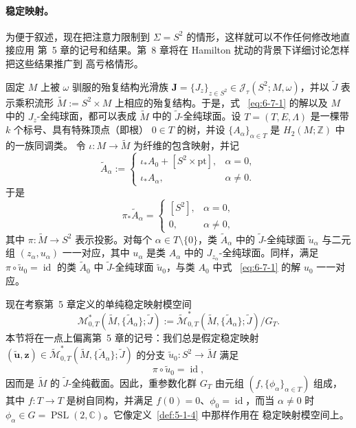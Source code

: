 \paragraph{稳定映射。}
为便于叙述，现在把注意力限制到 $\Sigma=S^2$ 的情形，这样就可以不作任何修改地直接应用
第~5 章的记号和结果。第~8 章将在 Hamilton 扰动的背景下详细讨论怎样把这些结果推广到
高亏格情形。

固定 $M$ 上被 $\omega$ 驯服的殆复结构光滑族
$\mathbf J=\{J_z\}_{z\in S^2}\in\mathcal J_\tau(S^2;M,\omega)$，并以
$\widetilde J$ 表示乘积流形 $\widetilde M:=S^2\times M$ 上相应的殆复结构。于是，式
~\eqref{eq:6-7-1} 的解以及 $M$ 中的 $J_z$-全纯球面，都可以表成 $\widetilde M$ 中的
$\widetilde J$-全纯球面。设 $T=(T,E,\Lambda)$ 是一棵带 $k$ 个标号、具有特殊顶点（即根）
$0\in T$ 的树，并设 $\{A_\alpha\}_{\alpha\in T}$ 是 $H_2(M;\mathbb Z)$ 中的一族同调类。
令 $\iota:M\to\widetilde M$ 为纤维的包含映射，并记
\[
  \widetilde A_\alpha
  :=\begin{cases}
    \iota_*A_0+[S^2\times\mathrm{pt}],&\alpha=0,\\
    \iota_*A_\alpha,&\alpha\ne0.
  \end{cases}
\]
于是
\[
  \pi_*\widetilde A_\alpha
  =\begin{cases}
    [S^2],&\alpha=0,\\
    0,&\alpha\ne0,
  \end{cases}
\]
其中 $\pi:\widetilde M\to S^2$ 表示投影。对每个 $\alpha\in T\setminus\{0\}$，类
$\widetilde A_\alpha$ 中的 $\widetilde J$-全纯球面 $\widetilde u_\alpha$ 与二元组
$(z_\alpha,u_\alpha)$ 一一对应，其中 $u_\alpha$ 是类 $A_\alpha$ 中的
$J_{z_\alpha}$-全纯球面。同样，满足 $\pi\circ\widetilde u_0=\operatorname{id}$ 的类
$\widetilde A_0$ 中 $\widetilde J$-全纯球面 $\widetilde u_0$，与类 $A_0$ 中式
~\eqref{eq:6-7-1} 的解 $u_0$ 一一对应。

现在考察第~5 章定义的单纯稳定映射模空间
\[
  \mathcal M^*_{0,T}(\widetilde M,\{\widetilde A_\alpha\};\widetilde J)
  :=\widetilde{\mathcal M}^*_{0,T}
      (\widetilde M,\{\widetilde A_\alpha\};\widetilde J)/G_T.
\]
本节将在一点上偏离第~5 章的记号：我们总是假定稳定映射
$(\widetilde{\mathbf u},\mathbf z)\in
\widetilde{\mathcal M}^*_{0,T}
(\widetilde M,\{\widetilde A_\alpha\};\widetilde J)$ 的分支
$\widetilde u_0:S^2\to\widetilde M$ 满足
\[
  \pi\circ\widetilde u_0=\operatorname{id},
\]
因而是 $\widetilde M$ 的 $\widetilde J$-全纯截面。因此，重参数化群 $G_T$ 由元组
$(f,\{\phi_\alpha\}_{\alpha\in T})$ 组成，其中 $f:T\to T$ 是树自同构，并满足
$f(0)=0$、$\phi_0=\operatorname{id}$，而当 $\alpha\ne0$ 时
$\phi_\alpha\in G=\operatorname{PSL}(2,\mathbb C)$。它像定义~\ref{def:5-1-4} 中那样作用在
稳定映射模空间上。

